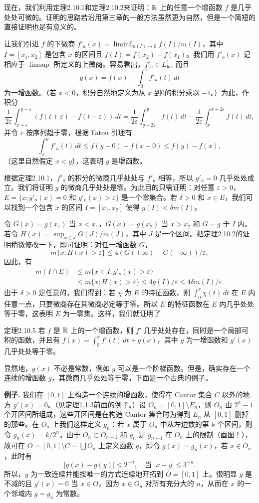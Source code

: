 现在，我们利用定理2.10.1和定理2.10.2来证明：$\mathbb R$ 上的任意一个增函数 $f$ 是几乎处处可微的。证明的思路若沿用第三章的一般方法虽然更为自然，但是一个简短的直接证明也是有意义的。

让我们引进 $f$ 的下微商 $f'_u(x)=\liminf_{m(I)\to0}f(I)/m(I)$，其中 $I=[x_1,x_2]$ 是包含 $x$ 的区间且 $f(I)=f(x_2)-f(x_1)$。我们用 $f'_o(x)$ 记相应于 $\limsup$ 所定义的上微商。容易看出，$f'_u\in L^1_{\mathrm{loc}}$ 而且
\[g(x)=f(x)-\int_0^x f'_u(t)\,dt\]
为一增函数。（若 $x<0$，积分自然地定义为从 $x$ 到0的积分乘以 $-1$。）为此，作积分
\[\frac1{2\varepsilon}\int_{x+\varepsilon}^{y-\varepsilon}(f(t+\varepsilon)-f(t-\varepsilon))\,dt=\frac1{2\varepsilon}\int_{y-2\varepsilon}^y f(t)\,dt-\frac1{2\varepsilon}\int_x^{x+2\varepsilon}f(t)\,dt,\]
并令 $\varepsilon$ 按序列趋于零，根据 Fatou 引理有
\[\int_x^y f'_u(t)\,dt\le f(y-0)-f(x+0)\le f(y)-f(x),\]
（这里自然假定 $x<y$），这表明 $g$ 是增函数。

根据定理2.10.1，$f'_u$ 的积分的微商几乎处处与 $f'_u$ 相等，所以 $g'_u=0$ 几乎处处成立。我们将证明 $g$ 的微商几乎处处是零。为此目的只需证明：对任意 $\varepsilon>0$，$E=\{x;g'_u(x)=0\text{ 和 }g'_o(x)>\varepsilon\}$ 是一个零集合。若 $\delta>0$ 和 $x\in E$，我们可以找到一个包含 $x$ 的区间 $I=[x_1,x_2]$ 使得 $g(I)<\delta m(I)$。

令 $G(x)=g(x_1)$ 当 $x<x_1$，$G(x)=g(x_2)$ 当 $x>x_2$ 和 $G=g$ 于 $I$ 内。若令 $H(x)=\sup_{x\in J}G(J)/m(J)$，其中 $J$ 是一个区间。把定理2.10.2的证明稍微修改一下，即可证明：对任一增函数 $G$，
\[m\{x;H(x)>\varepsilon\}\le4(G(+\infty)-G(-\infty))/\varepsilon,\]
因此，有
\[\begin{aligned}m(I\cap E)&\le m\{x\in I;g'_o(x)>\varepsilon\}\\&\le m\{x;H(x)>\varepsilon\}\le4g(I)/\varepsilon\le4\delta m(I)/\varepsilon.\end{aligned}\]
由于 $\delta>0$ 是任意的，我们得到：若 $\chi$ 为 $E$ 的特征函数，则 $\int_0^x\chi(t)\,dt$ 在 $E$ 内任意一点，只要微商存在其微商必定等于零。所以 $E$ 的特征函数在 $E$ 内几乎处处等于零，这表明 $E$ 为一零集。这样，我们就证明了
\begin{statement}{定理}{2.10.5}
若 $f$ 是 $\mathbb R$ 上的一个增函数，则 $f'$ 几乎处处存在，同时是一个局部可积的函数，并且有 $f(x)=\int_0^x f'(t)\,dt+g(x)$，其中 $g$ 为一增函数和 $g'(x)$ 几乎处处等于零。
\end{statement}
显然地，$g(x)$ 不必是常数，例如 $g$ 可以是一个阶梯函数。但是，确实存在一个连续的增函数 $g$，其微商几乎处处等于零。下面是一个古典的例子。

\textbf{例子.} 我们在 $[0,1]$ 上构造一个连续的增函数，使得在 Cantor 集合 $C$ 以外的地方 $g'(x)=0$。（见定理1.1.3前面的例子。）设 $O_n=[0,1]\setminus E_n$，则 $O_n$ 由 $2^n-1$ 个开区间所组成，这些开区间是在构造 Cantor 集合时为得到 $E_n$ 从 $[0,1]$ 删掉的那些。在 $O_n$ 上我们这样定义 $g_n$：若 $x$ 属于 $O_n$ 中从左边数的第 $k$ 个区间，则令 $g_n(x)=k/2^n$。由于 $O_n\subset O_{n+1}$ 和 $g_n$ 是 $g_{n+1}$ 在 $O_n$ 上的限制（画图！），故可在 $O=[0,1]\setminus C=\bigcup O_n$ 上定义函数 $g$，即令 $g(x)=g_n(x)$，若 $x\in O_n$，此时有
\[|g(x)-g(y)|\le2^{-n},\quad\text{当 }|x-y|\le3^{-n}.\]
所以，$g$ 为一致连续并能按唯一的方式连续地开拓到 $\overline O=[0,1]$ 上。很明显 $g$ 是不减的且 $g'(x)=0$ 当 $x\in O$，因为 $x\in O_n$ 对所有充分大的 $n$，从而在 $x$ 的一个邻域内 $g=g_n$ 为常数。

